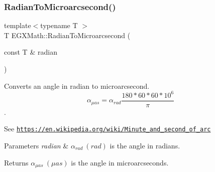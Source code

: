 \subsubsection{\texorpdfstring{Radian\+To\+Microarcsecond()}{RadianToMicroarcsecond()}}
{\footnotesize\ttfamily template$<$typename T $>$ \\
T E\+G\+X\+Math\+::\+Radian\+To\+Microarcsecond (\begin{DoxyParamCaption}\item[{const T \&}]{radian }\end{DoxyParamCaption})}



Converts an angle in radian to microarcsecond. \[\alpha_{\mu as}=\alpha_{rad}\frac{180 * 60 * 60 * 10^6}{\pi}\]. 

See \href{https://en.wikipedia.org/wiki/Minute_and_second_of_arc}{\tt https\+://en.\+wikipedia.\+org/wiki/\+Minute\+\_\+and\+\_\+second\+\_\+of\+\_\+arc} 
\begin{DoxyParams}{Parameters}
{\em radian} & $\alpha_{rad}\ (rad)$ is the angle in radians. \\
\hline
\end{DoxyParams}
\begin{DoxyReturn}{Returns}
$\alpha_{\mu as}\ (\mu as)$ is the angle in microarcseconds. 
\end{DoxyReturn}
